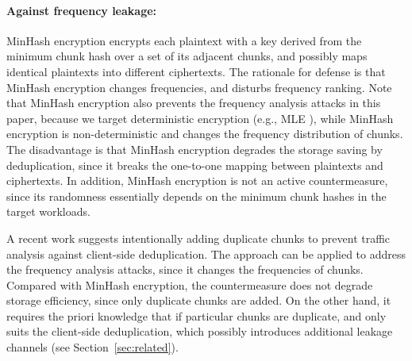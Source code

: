\documentclass[bachelor]{thesis-uestc}
\begin{document}
\paragraph{Against frequency leakage:}
MinHash encryption \cite{qin17, li17} encrypts each plaintext with a key derived from the minimum chunk hash over a set of its adjacent chunks, and possibly maps identical plaintexts into  different ciphertexts. The rationale for defense is that MinHash encryption changes frequencies, and disturbs frequency ranking. 
 Note that MinHash encryption also prevents the frequency analysis attacks in this paper, because  we target deterministic encryption (e.g., MLE \cite{bellare13a}), while MinHash encryption is non-deterministic and changes the  frequency distribution of chunks. The disadvantage is that MinHash encryption degrades the storage saving by deduplication, since it breaks the one-to-one mapping between plaintexts and ciphertexts. In addition, MinHash encryption is not an active countermeasure, since its randomness essentially depends on the minimum chunk hashes in the target workloads.            





A recent work \cite{zuo18} suggests intentionally adding duplicate chunks to prevent traffic analysis against client-side deduplication. The approach \cite{zuo18} can be applied to address the frequency analysis attacks, since it changes the frequencies of chunks. Compared with MinHash encryption, the countermeasure \cite{zuo18} does not degrade storage efficiency, since only duplicate chunks are added. On the other hand, it  requires the priori knowledge that if particular chunks are duplicate, and only suits the client-side deduplication, which possibly introduces additional leakage channels (see Section~\ref{sec:related}).  
\end{document}
